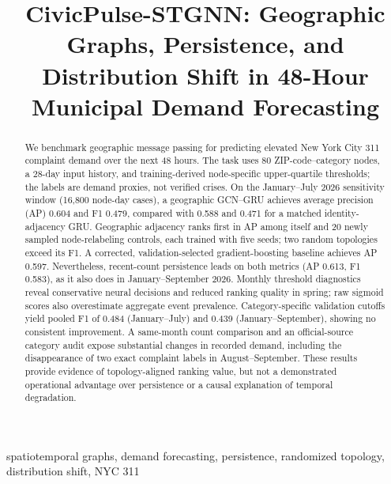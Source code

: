\documentclass[conference]{IEEEtran}
\begin{document}
\title{CivicPulse-STGNN: Geographic Graphs, Persistence, and Distribution Shift in 48-Hour Municipal Demand Forecasting}
\author{
}
\maketitle
\begin{abstract}
We benchmark geographic message passing for predicting elevated New York City 311 complaint demand over the next 48 hours. The task uses 80 ZIP-code--category nodes, a 28-day input history, and training-derived node-specific upper-quartile thresholds; the labels are demand proxies, not verified crises. On the January--July 2026 sensitivity window (16,800 node-day cases), a geographic GCN--GRU achieves average precision (AP) 0.604 and F1 0.479, compared with 0.588 and 0.471 for a matched identity-adjacency GRU. Geographic adjacency ranks first in AP among itself and 20 newly sampled node-relabeling controls, each trained with five seeds; two random topologies exceed its F1. A corrected, validation-selected gradient-boosting baseline achieves AP 0.597. Nevertheless, recent-count persistence leads on both metrics (AP 0.613, F1 0.583), as it also does in January--September 2026. Monthly threshold diagnostics reveal conservative neural decisions and reduced ranking quality in spring; raw sigmoid scores also overestimate aggregate event prevalence. Category-specific validation cutoffs yield pooled F1 of 0.484 (January--July) and 0.439 (January--September), showing no consistent improvement. A same-month count comparison and an official-source category audit expose substantial changes in recorded demand, including the disappearance of two exact complaint labels in August--September. These results provide evidence of topology-aligned ranking value, but not a demonstrated operational advantage over persistence or a causal explanation of temporal degradation.
\end{abstract}
\begin{IEEEkeywords}
spatiotemporal graphs, demand forecasting, persistence, randomized topology, distribution shift, NYC 311
\end{IEEEkeywords}
\end{document}
